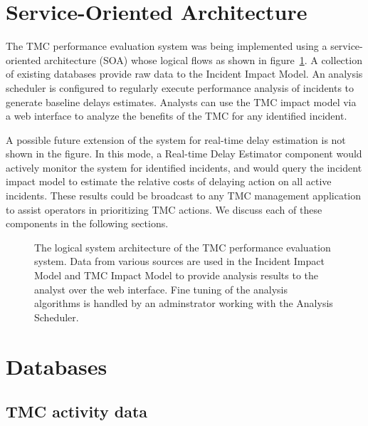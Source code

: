 \documentclass[12pt]{report}
\newcommand{\inputTikZ}[1]{%
    \begin{singlespace}
    \end{singlespace}
  }
\newcommand{\inputTikZ}[1]{%
    \begin{singlespace}
    \beginpgfgraphicnamed{#1-external}%
    \endpgfgraphicnamed%
    \end{singlespace}
  }
\newcounter{time}
\newcounter{space}
\begin{document}
\section{Service-Oriented Architecture}
\label{sec:soa}

The \ac{TMC} performance evaluation system was being implemented using a
service-oriented architecture (SOA) whose logical flows as shown in
figure~\ref{fig:logical-system-arch}. A collection of existing databases provide
raw data to the Incident Impact Model.  An analysis scheduler is configured to
regularly execute performance analysis of incidents to generate baseline delays
estimates.  Analysts can use the \ac{TMC} impact model via a web interface to
analyze the benefits of the \ac{TMC} for any identified incident.

A possible future extension of the system for real-time delay estimation is not
shown in the figure. In this mode, a Real-time Delay Estimator component would
actively monitor the system for identified incidents, and would query the
incident impact model to estimate the relative costs of delaying action on all
active incidents. These results could be broadcast to any \ac{TMC} management
application to assist operators in prioritizing \ac{TMC} actions.  We discuss
each of these components in the following sections.
\begin{figure}[t]
  \begin{center}
    \inputTikZ{figs/status}
    \caption{The logical system architecture of the TMC performance evaluation
      system.  Data from various sources are used in the Incident Impact Model
      and TMC Impact Model to provide analysis results to the analyst over the
      web interface.  Fine tuning of the analysis algorithms is handled by an
      adminstrator working with the Analysis Scheduler.}
    \label{fig:logical-system-arch}
  \end{center}
\end{figure}



\section{Databases}
\label{sec:databases}

\subsection{TMC activity data}
\label{sec:activity-data}
\end{document}

